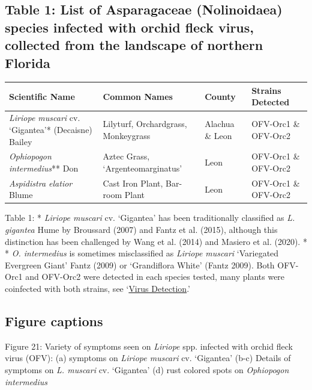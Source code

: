 \documentclass[12pt,final,CPage]{ufthesis}
\begin{document}
{  \hypertarget{table-1-list-of-asparagaceae-nolinoidaea-species-infected-with-orchid-fleck-virus-collected-from-the-landscape-of-northern-florida}{%
  \subsection{Table 1: List of Asparagaceae (Nolinoidaea) species infected with orchid fleck virus, collected from the landscape of northern Florida}\label{table-1-list-of-asparagaceae-nolinoidaea-species-infected-with-orchid-fleck-virus-collected-from-the-landscape-of-northern-florida}}
  \begin{longtable}[]{@{}
    >{\raggedright\arraybackslash}p{}
    >{\raggedright\arraybackslash}p{}
    >{\raggedright\arraybackslash}p{}
    >{\raggedright\arraybackslash}p{}@{}}
  \toprule
  Scientific Name & Common Names & County & Strains Detected \\
  \midrule
  \endhead
  \emph{Liriope muscari} cv. `Gigantea'* (Decaisne) Bailey & Lilyturf, Orchardgrass, Monkeygrass & Alachua \& Leon & OFV-Orc1 \& OFV-Orc2 \\
  \emph{Ophiopogon intermedius}** Don & Aztec Grass, `Argenteomarginatus' & Leon & OFV-Orc1 \& OFV-Orc2 \\
  \emph{Aspidistra elatior} Blume & Cast Iron Plant, Bar-room Plant & Leon & OFV-Orc1 \& OFV-Orc2 \\
  \bottomrule
  \end{longtable}
  Table 1: * \emph{Liriope muscari} cv. `Gigantea' has been traditionally classified as \emph{L. gigantea} Hume by Broussard (2007) and Fantz et al. (2015), although this distinction has been challenged by Wang et al. (2014) and Masiero et al. (2020). * * \emph{O. intermedius} is sometimes misclassified as \emph{Liriope muscari} `Variegated Evergreen Giant' Fantz (2009) or `Grandiflora White' (Fantz 2009). Both OFV-Orc1 and OFV-Orc2 were detected in each species tested, many plants were coinfected with both strains, see `\protect\hyperlink{virus-detection}{Virus Detection}.'

  \hypertarget{figure-captions}{%
  \subsection{Figure captions}\label{figure-captions}}

  Figure 21: Variety of symptoms seen on \emph{Liriope} spp. infected with orchid fleck virus (OFV): (a) symptoms on \emph{Liriope muscari} cv. `Gigantea' (b-c) Details of symptoms on \emph{L. muscari} cv. `Gigantea' (d) rust colored spots on \emph{Ophiopogon intermedius}

}
\end{document}
